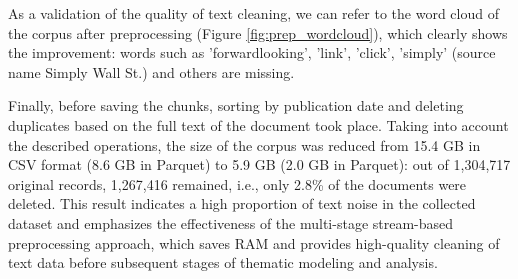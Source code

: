 As a validation of the quality of text cleaning, we can refer to the word cloud of the corpus after preprocessing
(Figure \ref{fig:prep_wordcloud}), which clearly shows the improvement: words such as 'forwardlooking', 'link', 'click', 'simply'
(source name Simply Wall St.) and others are missing.

Finally, before saving the chunks, sorting by publication date and deleting duplicates based on the full text of the document
took place. Taking into account the described operations, the size of the corpus was reduced from 15.4 GB in CSV format (8.6 GB
in Parquet) to 5.9 GB (2.0 GB in Parquet): out of 1,304,717 original records, 1,267,416 remained, i.e., only 2.8\%
of the documents were deleted. This result indicates a high proportion of text noise in the collected dataset and emphasizes
the effectiveness of the multi-stage stream-based preprocessing approach, which saves RAM and provides high-quality cleaning
of text data before subsequent stages of thematic modeling and analysis.
